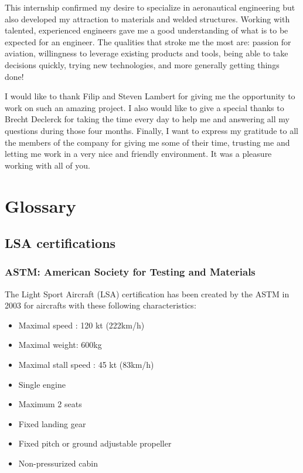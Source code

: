 \documentclass[11pt,a4paper]{article}
\begin{document}
\bigskip

This internship confirmed my desire to specialize in aeronautical engineering but also developed my attraction to materials and welded structures. Working with talented, experienced engineers gave me a good understanding of what is to be expected for an engineer. The qualities that stroke me the most are: passion for aviation, willingness to leverage existing products and tools, being able to take decisions quickly, trying new technologies, and more generally getting things done!

\bigskip

I would like to thank Filip and Steven Lambert for giving me the opportunity to work on such an amazing project. I also would like to give a special thanks to Brecht Declerck for taking the time every day to help me and answering all my questions during those four months. Finally, I want to express my gratitude to all the members of the company for giving me some of their time, trusting me and letting me work in a very nice and friendly environment. It was a pleasure working with all of you.

\newpage

\section{Glossary} 
\subsection{LSA certifications}
\subsubsection{ASTM: American Society for Testing and Materials}
The Light Sport Aircraft (LSA) certification has been created by the ASTM in 2003 for aircrafts with these following characteristics:
\begin{itemize}
\item Maximal speed : 120 kt (222km/h)
\item Maximal weight: 600kg
\item Maximal stall speed : 45 kt (83km/h)
\item Single engine
\item Maximum 2 seats
\item Fixed landing gear
\item Fixed pitch or ground adjustable propeller
\item Non-pressurized cabin
\end{itemize}
\end{document}
